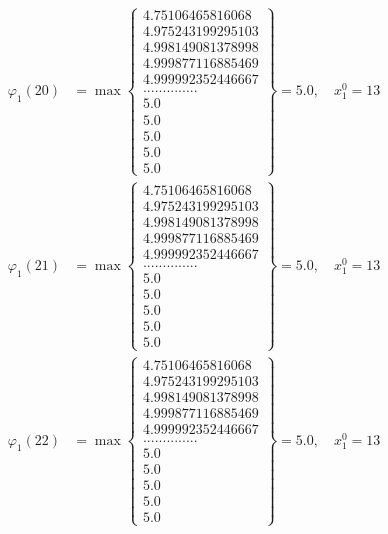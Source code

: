 \documentclass{article}
\begin{document}
\begin{align*}
  
  
  
\varphi_{1}(20) &= \max \left\{ \begin{array}{c}
4.75106465816068 \\
 4.975243199295103 \\
 4.998149081378998 \\
 4.999877116885469 \\
 4.999992352446667 \\
 .............. \\
 5.0 \\
 5.0 \\
 5.0 \\
 5.0 \\
 5.0
\end{array} \right\} = 5.0, \quad x_{1}^0 = 13\\
  
  
  
  
\varphi_{1}(21) &= \max \left\{ \begin{array}{c}
4.75106465816068 \\
 4.975243199295103 \\
 4.998149081378998 \\
 4.999877116885469 \\
 4.999992352446667 \\
 .............. \\
 5.0 \\
 5.0 \\
 5.0 \\
 5.0 \\
 5.0
\end{array} \right\} = 5.0, \quad x_{1}^0 = 13\\
  
  
  
  
\varphi_{1}(22) &= \max \left\{ \begin{array}{c}
4.75106465816068 \\
 4.975243199295103 \\
 4.998149081378998 \\
 4.999877116885469 \\
 4.999992352446667 \\
 .............. \\
 5.0 \\
 5.0 \\
 5.0 \\
 5.0 \\
 5.0
\end{array} \right\} = 5.0, \quad x_{1}^0 = 13\\
  

\end{align*}
\end{document}
